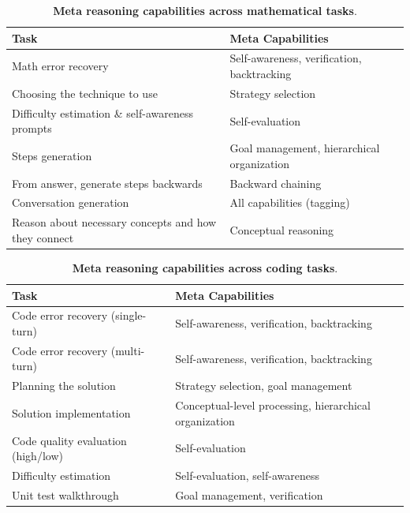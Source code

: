 \documentclass[table]{ai2style/ai2}
\begin{document}
{{\begin{table}[h!]
\centering
\begin{tabular}{ll}
\toprule
{\bf Task} & {\bf Meta Capabilities} \\
\midrule
\rowcolor{ai2offwhite} Math error recovery & Self-awareness, verification, backtracking \\
Choosing the technique to use & Strategy selection \\
\rowcolor{ai2offwhite} Difficulty estimation \& self-awareness prompts & Self-evaluation \\
Steps generation & Goal management, hierarchical organization \\
\rowcolor{ai2offwhite} From answer, generate steps backwards & Backward chaining \\
Conversation generation & All capabilities (tagging) \\
\rowcolor{ai2offwhite} Reason about necessary concepts and how they connect & Conceptual reasoning \\
\bottomrule
\end{tabular}
\caption{\textbf{Meta reasoning capabilities across mathematical tasks}.}
\label{tab:math-meta}
\end{table}

\begin{table}[h!]
\centering
\begin{tabular}{ll}
\toprule
{\bf Task} & {\bf Meta Capabilities} \\
\midrule
\rowcolor{ai2offwhite} Code error recovery (single-turn) & Self-awareness, verification, backtracking \\
Code error recovery (multi-turn) & Self-awareness, verification, backtracking \\
\rowcolor{ai2offwhite} Planning the solution & Strategy selection, goal management \\
Solution implementation & Conceptual-level processing, hierarchical organization \\
\rowcolor{ai2offwhite} Code quality evaluation (high/low) & Self-evaluation \\
Difficulty estimation & Self-evaluation, self-awareness \\
\rowcolor{ai2offwhite} Unit test walkthrough & Goal management, verification \\
\bottomrule
\end{tabular}
\caption{\textbf{Meta reasoning capabilities across coding tasks}.}
\label{tab:code-meta}
\end{table}

}}
\end{document}
